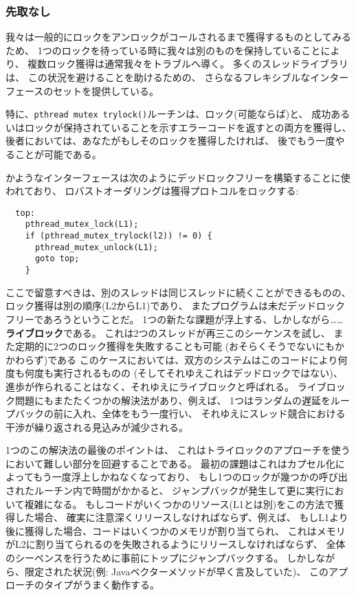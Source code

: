 \documentclass[11pt,a4paper, uplatex]{jsarticle}
\begin{document}
\subsubsection{先取なし}
我々は一般的にロックをアンロックがコールされるまで獲得するものとしてみるため、
1つのロックを待っている時に我々は別のものを保持していることにより、
複数ロック獲得は通常我々をトラブルへ導く。
多くのスレッドライブラリは、
この状況を避けることを助けるための、
さらなるフレキシブルなインターフェースのセットを提供している。

特に、\texttt{pthread mutex trylock()}ルーチンは、ロック(可能ならば)と、
成功あるいはロックが保持されていることを示すエラーコードを返すとの両方を獲得し、
後者においては、あなたがもしそのロックを獲得したければ、
後でもう一度やることが可能である。

かようなインターフェースは次のようにデッドロックフリーを構築することに使われており、
ロバストオーダリングは獲得プロトコルをロックする:

\begin{lstlisting}
  top:
    pthread_mutex_lock(L1);
    if (pthread_mutex_trylock(l2)) != 0) {
      pthread_mutex_unlock(L1);
      goto top;
    }
\end{lstlisting}

ここで留意すべきは、別のスレッドは同じスレッドに続くことができるものの、
ロック獲得は別の順序(L2からL1)であり、
またプログラムは未だデッドロックフリーであろうということだ。
1つの新たな課題が浮上する、しかしながら……\textbf{ライブロック}である。
これは2つのスレッドが再三このシーケンスを試し、
また定期的に2つのロック獲得を失敗することも可能
(おそらくそうでないにもかかわらず)である
このケースにおいては、双方のシステムはこのコードにより何度も何度も実行されるものの
(そしてそれゆえこれはデッドロックではない)、
進歩が作られることはなく、それゆえにライブロックと呼ばれる。
ライブロック問題にもまたたくつかの解決法があり、例えば、
1つはランダムの遅延をループバックの前に入れ、全体をもう一度行い、
それゆえにスレッド競合における干渉が繰り返される見込みが減少される。

1つのこの解決法の最後のポイントは、
これはトライロックのアプローチを使うにおいて難しい部分を回避することである。
最初の課題はこれはカプセル化によってもう一度浮上しかねなくなっており、
もし1つのロックが幾つかの呼び出されたルーチン内で時間がかかると、
ジャンプバックが発生して更に実行において複雑になる。
もしコードがいくつかのリソース(L1とは別)をこの方法で獲得した場合、
確実に注意深くリリースしなければならず、例えば、
もしL1より後に獲得した場合、コードはいくつかのメモリが割り当てられ、
これはメモリがL2に割り当てられるのを失敗されるようにリリースしなければならず、
全体のシーペンスを行うために事前にトップにジャンプバックする。
しかしながら、限定された状況(例: Javaベクターメソッドが早く言及していた)、
このアプローチのタイプがうまく動作する。
\end{document}
